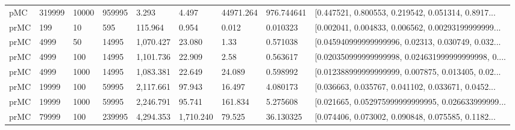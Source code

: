 \begin{tabular}{lllllllll}
 pMC & 319999 &      10000 &      959995 &     3.293 &            4.497 &                    44971.264 &     976.744641 & [0.447521, 0.800553, 0.219542, 0.051314, 0.8917... \\
prMC &    199 &         10 &         595 &   115.964 &            0.954 &                        0.012 &       0.010323 & [0.002041, 0.004833, 0.006562, 0.00293199999999... \\
prMC &   4999 &         50 &       14995 & 1,070.427 &           23.080 &                         1.33 &       0.571038 & [0.045940999999999996, 0.02313, 0.030749, 0.032... \\
prMC &   4999 &        100 &       14995 & 1,101.736 &           22.909 &                         2.58 &       0.563617 & [0.020350999999999998, 0.024631999999999998, 0.... \\
prMC &   4999 &       1000 &       14995 & 1,083.381 &           22.649 &                       24.089 &       0.598992 & [0.012388999999999999, 0.007875, 0.013405, 0.02... \\
prMC &  19999 &        100 &       59995 & 2,117.661 &           97.943 &                       16.497 &       4.080173 & [0.036663, 0.035767, 0.041102, 0.033671, 0.0452... \\
prMC &  19999 &       1000 &       59995 & 2,246.791 &           95.741 &                      161.834 &       5.275608 & [0.021665, 0.052975999999999995, 0.026633999999... \\
prMC &  79999 &        100 &      239995 & 4,294.353 &        1,710.240 &                       79.525 &      36.130325 & [0.074406, 0.073002, 0.090848, 0.075585, 0.1182... \\
\bottomrule
\end{tabular}
